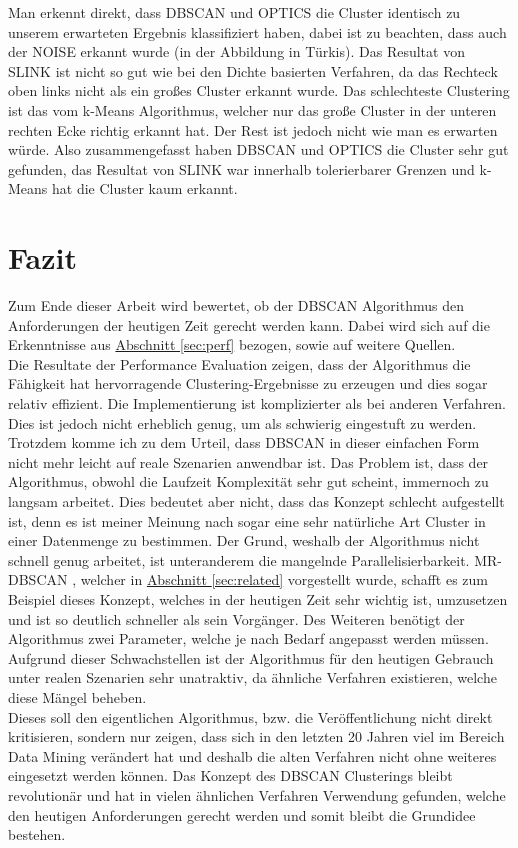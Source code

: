 \documentclass{lni}
\begin{document}
Man erkennt direkt, dass DBSCAN und OPTICS die Cluster identisch zu unserem erwarteten Ergebnis klassifiziert haben, dabei ist zu beachten, dass auch der NOISE erkannt wurde (in der Abbildung in Türkis). Das Resultat von SLINK ist nicht so gut wie bei den Dichte basierten Verfahren, da das Rechteck oben links nicht als ein großes Cluster erkannt wurde. Das schlechteste Clustering ist das vom k-Means Algorithmus, welcher nur das große Cluster in der unteren rechten Ecke richtig erkannt hat. Der Rest ist jedoch nicht wie man es erwarten würde.
Also zusammengefasst haben DBSCAN und OPTICS die Cluster sehr gut gefunden, das Resultat von SLINK war innerhalb tolerierbarer Grenzen und k-Means hat die Cluster kaum erkannt.

%
%

\section{Fazit}
\label{sec:fazit}
Zum Ende dieser Arbeit wird bewertet, ob der DBSCAN Algorithmus den Anforderungen der heutigen Zeit gerecht werden kann. Dabei wird sich auf die Erkenntnisse aus \hyperref[sec:perf]{Abschnitt \ref{sec:perf}} bezogen, sowie auf weitere Quellen.\\
Die Resultate der Performance Evaluation zeigen, dass der Algorithmus die Fähigkeit hat hervorragende Clustering-Ergebnisse zu erzeugen und dies sogar relativ effizient. Die Implementierung ist komplizierter als bei anderen Verfahren. Dies ist jedoch nicht erheblich genug, um als schwierig eingestuft zu werden.\\
Trotzdem komme ich zu dem Urteil, dass DBSCAN in dieser einfachen Form nicht mehr leicht auf reale Szenarien anwendbar ist. Das Problem ist, dass der Algorithmus, obwohl die Laufzeit Komplexität sehr gut scheint, immernoch zu langsam arbeitet. Dies bedeutet aber nicht, dass das Konzept schlecht aufgestellt ist, denn es ist meiner Meinung nach sogar eine sehr natürliche Art Cluster in einer Datenmenge zu bestimmen. Der Grund, weshalb der Algorithmus nicht schnell genug arbeitet, ist unteranderem die mangelnde Parallelisierbarkeit. MR-DBSCAN \cite{PARALLEL}, welcher in \hyperref[sec:perf]{Abschnitt \ref{sec:related}} vorgestellt wurde, schafft es zum Beispiel dieses Konzept, welches in der heutigen Zeit sehr wichtig ist, umzusetzen und ist so deutlich schneller als sein Vorgänger. Des Weiteren benötigt der Algorithmus zwei Parameter, welche je nach Bedarf angepasst werden müssen. Aufgrund dieser Schwachstellen ist der Algorithmus für den heutigen Gebrauch unter realen Szenarien sehr unatraktiv, da ähnliche Verfahren \cite{PPF} existieren, welche diese Mängel beheben.\\
Dieses soll den eigentlichen Algorithmus, bzw. die Veröffentlichung nicht direkt kritisieren, sondern nur zeigen, dass sich in den letzten 20 Jahren viel im Bereich Data Mining verändert hat und deshalb die alten Verfahren nicht ohne weiteres eingesetzt werden können. Das Konzept des DBSCAN Clusterings bleibt revolutionär und hat in vielen ähnlichen Verfahren Verwendung gefunden, welche den heutigen Anforderungen gerecht werden und somit bleibt die Grundidee bestehen.


\end{document}
